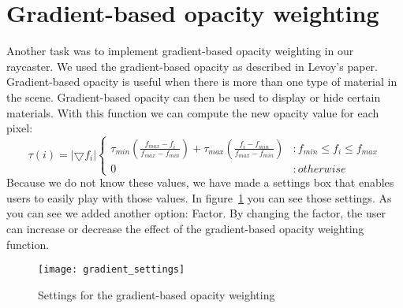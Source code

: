 \section{Gradient-based opacity weighting}\label{Sec:Gow}
Another task was to implement gradient-based opacity weighting in our raycaster.
We used the gradient-based opacity as described in Levoy’s paper.
Gradient-based opacity is useful when there is more than one type of  material in the scene. 
Gradient-based opacity can then be used to display or hide certain materials.
With this function we can compute the new opacity value for each pixel:
\[ \tau(i) = |\bigtriangledown f_{i}| \left\{
  \begin{array}{lr}
   \tau_{min} (\frac{ f_{max}- f_{i}}{ f_{max}- f_{min}}) +\tau_{max}( \frac{ f_{i}- f_{min}}{ f_{max}- f_{min}})  & : f_{min} \leq f_{i}  \leq f_{max} \\
    0 & : otherwise 
  \end{array}
\right.
\] 
Because we do not know these values, we have made a settings box that enables users to easily play with those values.
In figure~\ref{fig:gradient_settings} you can see those settings. 
As you can see we added another option: Factor. 
By changing the factor, the user can increase or decrease the effect of the gradient-based opacity weighting function.
\begin{figure}[H]
	\centering
		\texttt{[image: gradient\_settings]}
		\caption{Settings for the gradient-based opacity weighting}
	\label{fig:gradient_settings}
\end{figure}